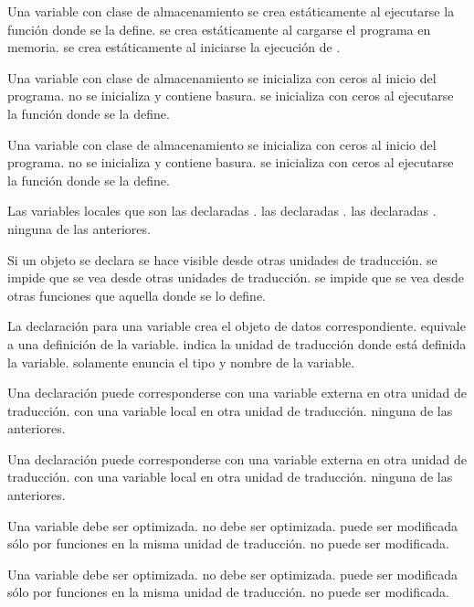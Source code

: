 \begin{preguntas}
\question Una variable con clase de almacenamiento  
\choice se crea estáticamente al ejecutarse la función donde se la define.
\correctchoice se crea estáticamente al cargarse el programa en memoria.
\choice se crea estáticamente al iniciarse la ejecución de .

\question Una variable con clase de almacenamiento  
\correctchoice se inicializa con ceros al inicio del programa.
\choice no se inicializa y contiene basura.
\choice se inicializa con ceros al ejecutarse la función donde se la define.

\question Una variable con clase de almacenamiento 
\choice se inicializa con ceros al inicio del programa.
\correctchoice no se inicializa y contiene basura.
\choice se inicializa con ceros al ejecutarse la función donde se la define.

\question Las variables locales que  son
\choice las declaradas .
\correctchoice las declaradas .
\choice las declaradas .
\choice ninguna de las anteriores.

\question Si un objeto se declara 
\choice se hace visible desde otras unidades de traducción.
\correctchoice se impide que se vea desde otras unidades de traducción.
\choice se impide que se vea desde otras funciones que aquella donde se lo define.

\question La declaración  para una variable
\choice crea el objeto de datos correspondiente.
\choice equivale a una definición de la variable.
\choice indica la unidad de traducción donde está definida la variable.
\correctchoice solamente enuncia el tipo y nombre de la variable.

\question Una declaración  puede corresponderse
\correctchoice con una variable externa en otra unidad de traducción.
\choice con una variable local en otra unidad de traducción.
\choice ninguna de las anteriores.

\question Una declaración  puede corresponderse
\choice con una variable externa en otra unidad de traducción.
\choice con una variable local en otra unidad de traducción.
\correctchoice ninguna de las anteriores.

\question Una variable  
\choice debe ser optimizada.
\choice no debe ser optimizada.
\choice puede ser modificada sólo por funciones en la misma unidad de traducción.
\correctchoice no puede ser modificada.

\question Una variable  
\choice debe ser optimizada.
\correctchoice no debe ser optimizada.
\choice puede ser modificada sólo por funciones en la misma unidad de traducción.
\choice no puede ser modificada.
\end{preguntas}
